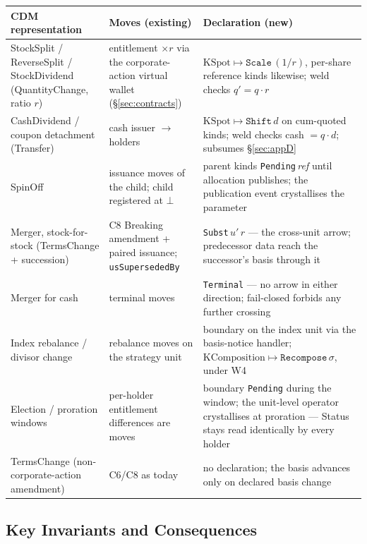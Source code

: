 \renewcommand{\arraystretch}{1.25}
\begin{center}
\begin{longtable}{@{}p{4.4cm} p{4.2cm} p{4.8cm}@{}}
\toprule
\textbf{CDM representation} & \textbf{Moves (existing)} & \textbf{Declaration (new)} \\
\midrule
\endhead
StockSplit / ReverseSplit / StockDividend (QuantityChange, ratio $r$) & entitlement
$\times r$ via the corporate-action virtual wallet (\S\ref{sec:contracts}) &
$\mathrm{KSpot}\mapsto\texttt{Scale}\,(1/r)$, per-share reference kinds likewise; weld
checks $q'=q\cdot r$ \\
\addlinespace
CashDividend / coupon detachment (Transfer) & cash issuer $\to$ holders &
$\mathrm{KSpot}\mapsto\texttt{Shift}\,d$ on cum-quoted kinds; weld checks cash
$=q\cdot d$; subsumes \S\ref{sec:appD} \\
\addlinespace
SpinOff & issuance moves of the child; child registered at $\bot$ & parent kinds
\texttt{Pending}\,\textit{ref} until allocation publishes; the publication event
crystallises the parameter \\
\addlinespace
Merger, stock-for-stock (TermsChange + succession) & C8 Breaking amendment + paired
issuance; \texttt{usSupersededBy} & \texttt{Subst}\,$u'\,r$ --- the cross-unit arrow;
predecessor data reach the successor's basis through it \\
\addlinespace
Merger for cash & terminal moves & \texttt{Terminal} --- no arrow in either direction;
fail-closed forbids any further crossing \\
\addlinespace
Index rebalance / divisor change & rebalance moves on the strategy unit & boundary on
the index unit via the basis-notice handler;
$\mathrm{KComposition}\mapsto\texttt{Recompose}\,\sigma$, under W4 \\
\addlinespace
Election / proration windows & per-holder entitlement differences are moves & boundary
\texttt{Pending} during the window; the unit-level operator crystallises at proration
--- Status stays read identically by every holder \\
\addlinespace
TermsChange (non-corporate-action amendment) & C6/C8 as today & no declaration; the
basis advances only on declared basis change \\
\bottomrule
\end{longtable}
\end{center}

\subsection*{Key Invariants and Consequences}

